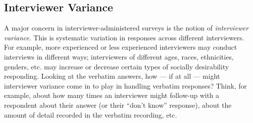\documentclass[12pt, a4]{article}
\begin{document}
\subsection*{Interviewer Variance}

\noindent A major concern in interviewer-administered surveys is the notion of \textit{interviewer variance}. This is systematic variation in responses across different interviewers. For example, more experienced or less experienced interviewers may conduct interviews in different ways; interviewers of different ages, races, ethnicities, genders, etc. may increase or decrease certain types of socially desirability responding. Looking at the verbatim answers, how --- if at all --- might interviewer variance come in to play in handling verbatim responses? Think, for example, about how many times an interviewer might follow-up with a respondent about their answer (or their ``don't know'' response), about the amount of detail recorded in the verbatim recording, etc.
\end{document}
